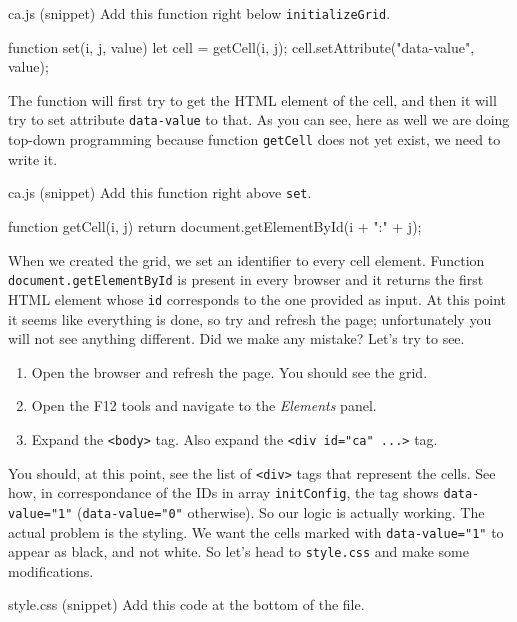 \begin{programcode}{ca.js (snippet)}
Add this function right below \texttt{initializeGrid}.
\begin{code}
function set(i, j, value) {
  let cell = getCell(i, j);
  cell.setAttribute("data-value", value);
}
\end{code}
\end{programcode}

The function will first try to get the HTML element of the cell, and then it will try to set attribute
\texttt{data-value} to that. As you can see, here as well we are doing top-down programming because
function \texttt{getCell} does not yet exist, we need to write it.

\begin{programcode}{ca.js (snippet)}
Add this function right above \texttt{set}.
\begin{code}
function getCell(i, j) {
  return document.getElementById(i + ":" + j);
}
\end{code}
\end{programcode}

When we created the grid, we set an identifier to every cell element. Function \texttt{document.getElementById}
is present in every browser and it returns the first HTML element whose \texttt{id} corresponds to the one
provided as input. At this point it seems like everything is done, so try and refresh the page; unfortunately
you will not see anything different. Did we make any mistake? Let's try to see.

\begin{enumerate}
\item Open the browser and refresh the page. You should see the grid.
\item Open the F12 tools and navigate to the \textit{Elements} panel.
\item Expand the \texttt{<body>} tag. Also expand the \texttt{<div id="ca" ...>} tag.
\end{enumerate}

You should, at this point, see the list of \texttt{<div>} tags that represent the cells. See how, in correspondance
of the IDs in array \texttt{initConfig}, the tag shows \texttt{data-value="1"} (\texttt{data-value="0"}
otherwise). So our logic is actually working. The actual problem is the styling. We want the cells marked with
\texttt{data-value="1"} to appear as black, and not white. So let's head to \texttt{style.css} and make some
modifications.

\begin{programcode}{style.css (snippet)}
Add this code at the bottom of the file.
\end{programcode}

